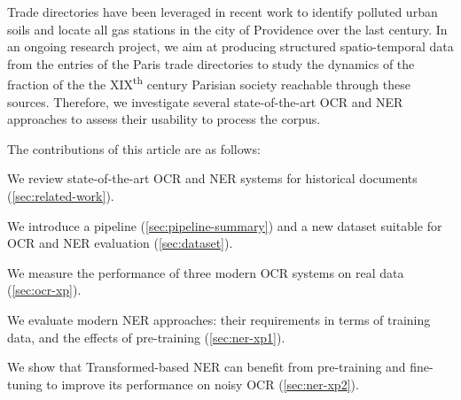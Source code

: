 Trade directories have been leveraged in recent work to identify polluted urban soils \cite{bell2020automated} and locate all gas stations in the city of Providence over the last century.
In an ongoing research project, we aim at producing structured spatio-temporal data from the entries of the Paris trade directories to study the dynamics of the fraction of the the XIX\textsuperscript{th} century Parisian society reachable through these sources.
Therefore, we investigate several state-of-the-art OCR and NER approaches to assess their usability to process the corpus.

The contributions of this article are as follows:
\begin{enumerate*}[(i)]
    \item We review state-of-the-art OCR and NER systems for historical documents (\cref{sec:related-work}).
    \item We introduce a pipeline (\cref{sec:pipeline-summary}) and a new dataset suitable for OCR and NER evaluation (\cref{sec:dataset}).
    \item We measure the performance of three modern OCR systems on real data (\cref{sec:ocr-xp}).
    \item We evaluate modern NER approaches: their requirements in terms of training data, and the effects of pre-training (\cref{sec:ner-xp1}).
    \item We show that Transformed-based NER can benefit from pre-training and fine-tuning to improve its performance on noisy OCR (\cref{sec:ner-xp2}).
\end{enumerate*}


